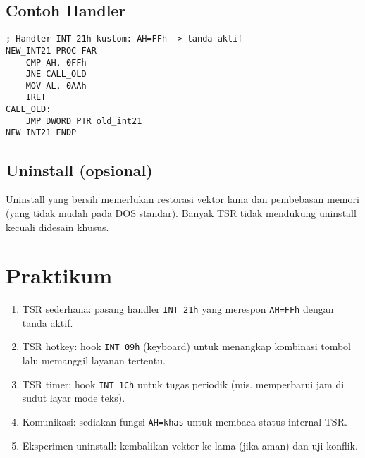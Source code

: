 \subsection{Contoh Handler}
\begin{verbatim}
; Handler INT 21h kustom: AH=FFh -> tanda aktif
NEW_INT21 PROC FAR
    CMP AH, 0FFh
    JNE CALL_OLD
    MOV AL, 0AAh
    IRET
CALL_OLD:
    JMP DWORD PTR old_int21
NEW_INT21 ENDP
\end{verbatim}

\subsection{Uninstall (opsional)}
Uninstall yang bersih memerlukan restorasi vektor lama dan pembebasan memori (yang tidak mudah pada DOS standar). Banyak TSR tidak mendukung uninstall kecuali didesain khusus.

\section{Praktikum}
\begin{enumerate}
  \item TSR sederhana: pasang handler \texttt{INT 21h} yang merespon \texttt{AH=FFh} dengan tanda aktif.
  \item TSR hotkey: hook \texttt{INT 09h} (keyboard) untuk menangkap kombinasi tombol lalu memanggil layanan tertentu.
  \item TSR timer: hook \texttt{INT 1Ch} untuk tugas periodik (mis. memperbarui jam di sudut layar mode teks).
  \item Komunikasi: sediakan fungsi \texttt{AH=khas} untuk membaca status internal TSR.
  \item Eksperimen uninstall: kembalikan vektor ke lama (jika aman) dan uji konflik.
\end{enumerate}


